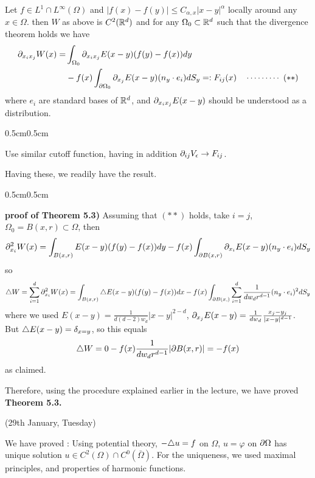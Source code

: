 \documentclass[12pt,a4paper]{article}
\newenvironment{proof}
{\begin{changemargin}{0.5cm}{0.5cm} 
	}%
	{\end{changemargin}
}
\newenvironment{p}
{\begin{proof} 
	}%
	{\end{proof}
}
\begin{document}
 Let $f\in L^1 \cap L^{\infty}(\Omega)$ and $|f(x)-f(y)|\leq C_{\alpha,x} |x-y|^{\alpha}$ locally around any $x\in \Omega$. then $W$ as above is $C^2(\mathbb{R}^d)$ and for any $\Omega_0 \subset \mathbb{R}^d$ such that the divergence theorem holds we have
\begin{align*}
\partial_{x_i x_j} W(x) = &\int_{\Omega_0} \partial_{x_i x_j} E(x-y) (f(y)- f(x))  dy \\
&- f(x)\int_{\partial \Omega_0} \partial_{x_j} E(x-y) (n_y \cdot e_i) dS_y =: F_{ij}(x) \quad \cdots\cdots\cdots\,\,(**)
\end{align*}
where $e_i$ are standard bases of $\mathbb{R}^d$, and $\partial_{x_i x_j} E(x-y)$ should be understood as a distribution.
\begin{proof}
\pf Use similar cutoff function, having in addition $\partial_{ij} V_{\epsilon} \rightarrow F_{ij}$. 
\end{proof}
\s

Having these, we readily have the result.
\s

\begin{p}
\textbf{proof of Theorem 5.3)} Assuming that $(**)$ holds, take $i=j$, $\Omega_0 = B(x,r) \subset \Omega$, then
\begin{align*}
\partial_{x_i}^2 W(x) = \int_{B(x,r)} E(x-y) (f(y)- f(x))dy - f(x) \int_{\partial B(x,r)} \partial_{x_i} E(x-y)(n_y \cdot e_i) dS_y
\end{align*}
so
\begin{align*}
\triangle W = \sum_{i=1}^d \partial_{x_i}^2 W(x) = \int_{B(x,r)} \triangle E(x-y) (f(y)- f(x))dx - f(x) \int_{\partial B(x,)} \sum_{i=1}^d \frac{1}{dw_d r^{d-1}} (n_y \cdot e_i)^2 dS_y
\end{align*}
where we used $E(x-y) = \frac{1}{d(d-2)w_d}|x-y|^{2-d}$, $\partial_{x_j} E(x-y) = \frac{1}{dw_d} \frac{x_j - y_j}{|x-y|^{d-1}}$. But $\triangle E(x-y) = \delta_{x=y}$, so this equals
\begin{align*}
\triangle W = 0 - f(x)\frac{1}{d w_d r^{d-1}} |\partial B(x,r)| = -f(x)
\end{align*}
as claimed.
\s

Therefore, using the procedure explained earlier in the lecture, we have proved \textbf{Theorem 5.3.}

\eop
\end{p}
\s

\newday

(29th January, Tuesday)
\s

We have proved : Using potential theory, $-\triangle u =f$ on $\Omega$, $u= \varphi$ on $\partial \Omega$ has unique solution $u\in C^2(\Omega) \cap C^0(\bar{\Omega})$. For the uniqueness, we used maximal principles, and properties of harmonic functions.
\s
\end{document}
